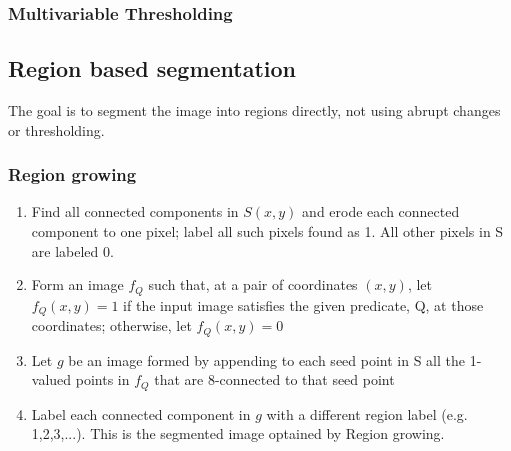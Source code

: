\subsubsection{Multivariable Thresholding}

\subsection{Region based segmentation}
The goal is to segment the image into regions directly, not using abrupt changes or thresholding.
\subsubsection{Region growing}
\begin{enumerate}
\item Find all connected components in $S(x,y)$ and erode each connected component to one pixel; label all such pixels found as 1. All other pixels in S are labeled 0.
\item Form an image $f_Q$ such that, at a pair of coordinates $(x,y)$, let $f_Q(x,y)=1$ if the input image satisfies the given predicate, Q, at those coordinates; otherwise, let $f_Q(x,y)=0$
\item Let $g$ be an image formed by appending to each seed point in S all the 1-valued points in $f_Q$ that are 8-connected to that seed point
\item Label each connected component in $g$ with a different region label (e.g. 1,2,3,...). This is the segmented image optained by Region growing.
\end{enumerate}
